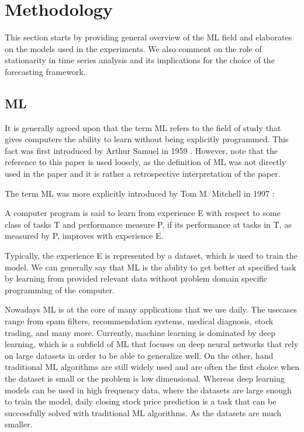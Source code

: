 \chapter{Methodology}
\label{chap:four}

This section starts by providing general
overview of the \ac{ML} field and elaborates 
on the models used in the experiments. 
We also comment on the role of stationarity in time series analysis
and its implications for the choice of the forecasting framework.

\section{\acl{ML}}

It is generally agreed upon that the term 
\ac{ML} refers to the field of study that gives computers the ability to learn 
without being explicitly programmed. This fact was first 
introduced by Arthur Samuel in 1959 \citep{Samuel1959}. However, note that the reference to this paper is used
loosely, as the definition of \ac{ML} was not directly used in the paper and it is rather 
a retrospective interpretation of the paper. 

The term \ac{ML} was more explicitly introduced by Tom M. Mitchell in 1997 \citep{Mitchell1997}:

\begin{defin}\label{de:ml}
    A computer program is said to learn from experience E with respect
    to some class of tasks T and performance measure P, if its performance at tasks in
    T, as measured by P, improves with experience E. 
\end{defin}

Typically, the experience E is represented by a dataset, which is used to train the model. 
We can generally say that \ac{ML} is the ability to get better at specified task by learning
from provided relevant data without problem domain specific programming of the computer.


Nowadays \ac{ML} is at the core of many applications that we use daily. The usecases range from
spam filters, recommendation systems, medical diagnosis, stock trading, and many more. Currently, 
machine learning is dominated by deep learning, which is a subfield of \ac{ML} that focuses on
deep neural networks that rely on large datasets in order to be able to generalize well.
On the other, hand traditional \ac{ML} algorithms are still widely used and are often the first choice
when the dataset is small or the problem is low dimensional. Whereas deep learning models
can be used in high frequency data, where the datasets are large enough to train the model, 
daily closing stock price prediction is a task that can be successfully solved with 
traditional \ac{ML} algorithms. As the datasets are much smaller. 


